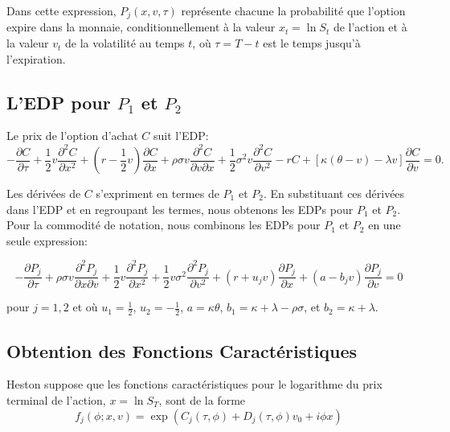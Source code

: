 Dans cette expression, $P_j(x,v,\tau)$ représente chacune la probabilité que l'option expire dans la monnaie, conditionnellement à la valeur $x_t = \ln S_t$ de l'action et à la valeur $v_t$ de la volatilité au temps $t$, où $\tau = T-t$ est le temps jusqu'à l'expiration.

\subsection{L'EDP pour $P_1$ et $P_2$}

Le prix de l'option d'achat $C$ suit l'EDP:
\begin{equation}
-\frac{\partial C}{\partial \tau} + \frac{1}{2}v\frac{\partial^2 C}{\partial x^2} + \left(r - \frac{1}{2}v\right)\frac{\partial C}{\partial x} + \rho\sigma v\frac{\partial^2 C}{\partial v \partial x} + \frac{1}{2}\sigma^2 v\frac{\partial^2 C}{\partial v^2} - rC + [\kappa(\theta - v) - \lambda v]\frac{\partial C}{\partial v} = 0.
\end{equation}

Les dérivées de $C$ s'expriment en termes de $P_1$ et $P_2$. En substituant ces dérivées dans l'EDP et en regroupant les termes, nous obtenons les EDPs pour $P_1$ et $P_2$. Pour la commodité de notation, nous combinons les EDPs pour $P_1$ et $P_2$ en une seule expression:

\begin{equation}
-\frac{\partial P_j}{\partial \tau} + \rho\sigma v\frac{\partial^2 P_j}{\partial x \partial v} + \frac{1}{2}v\frac{\partial^2 P_j}{\partial x^2} + \frac{1}{2}v\sigma^2\frac{\partial^2 P_j}{\partial v^2} + (r + u_j v)\frac{\partial P_j}{\partial x} + (a - b_j v)\frac{\partial P_j}{\partial v} = 0
\end{equation}

pour $j = 1, 2$ et où $u_1 = \frac{1}{2}$, $u_2 = -\frac{1}{2}$, $a = \kappa\theta$, $b_1 = \kappa + \lambda - \rho\sigma$, et $b_2 = \kappa + \lambda$.

\subsection{Obtention des Fonctions Caractéristiques}

Heston suppose que les fonctions caractéristiques pour le logarithme du prix terminal de l'action, $x = \ln S_T$, sont de la forme
\begin{equation}
f_j(\phi; x, v) = \exp(C_j(\tau, \phi) + D_j(\tau, \phi)v_0 + i\phi x)
\end{equation}

